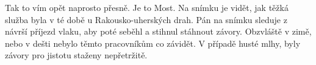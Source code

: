 
Tak to vím opět naprosto přesně. Je to Most. Na snímku je vidět, jak
těžká služba byla v té době u Rakousko-uherských drah. Pán na snímku
sleduje z návrší příjezd vlaku, aby poté seběhl a stihnul stáhnout
závory. Obzvláště v zimě, nebo v dešti nebylo těmto pracovníkům co
závidět. V případě husté mlhy, byly závory pro jistotu staženy
nepřetržitě.

